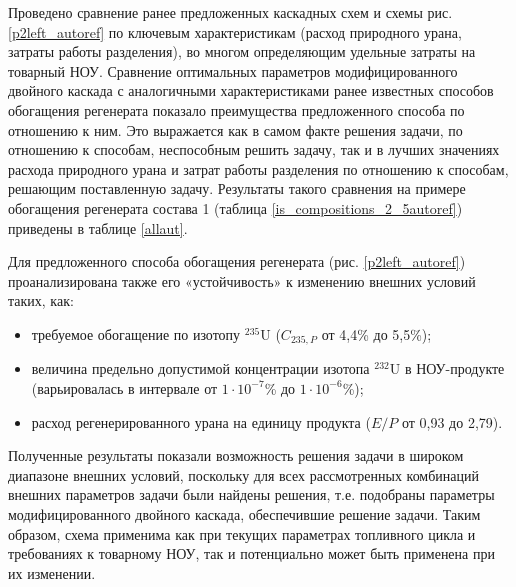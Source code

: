 Проведено сравнение ранее предложенных каскадных схем и схемы рис. \ref{p2left_autoref} по ключевым характеристикам (расход природного урана, затраты работы разделения), во многом определяющим удельные затраты на товарный НОУ. Сравнение оптимальных параметров модифицированного двойного каскада с аналогичными характеристиками ранее известных способов обогащения регенерата показало преимущества предложенного способа по отношению к ним. Это выражается как в самом факте решения задачи, по отношению к способам, неспособным решить задачу, так и в лучших значениях расхода природного урана и затрат работы разделения по отношению к способам, решающим поставленную задачу. Результаты такого сравнения на примере обогащения регенерата состава 1 (таблица \ref{is_compositions_2_5autoref}) приведены в таблице \ref{allaut}. 

Для предложенного способа обогащения регенерата (рис. \ref{p2left_autoref}) проанализирована также его «устойчивость» к изменению внешних условий таких, как:
\begin{itemize}
  \item требуемое обогащение по изотопу $^{235}$U ($C_{235,P}$ от  4,4\% до  5,5\%);    
  \item величина предельно допустимой концентрации изотопа $^{232}$U в НОУ-продукте (варьировалась в интервале от $1\cdot10^{-7}$\% до $1\cdot10^{-6}$\%);
  \item расход регенерированного урана на единицу продукта ($E/P$ от 0,93 до 2,79).
\end{itemize}

Полученные результаты показали возможность решения задачи в широком диапазоне внешних условий, поскольку для всех рассмотренных комбинаций внешних параметров задачи были найдены решения, т.е. подобраны параметры модифицированного двойного каскада, обеспечившие решение задачи. Таким образом, схема применима как при текущих параметрах топливного цикла и требованиях к товарному НОУ, так и потенциально может быть применена при их изменении.

